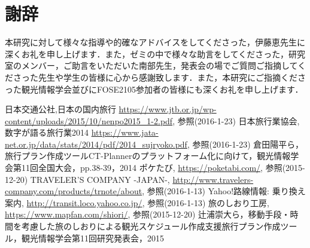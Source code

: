 \documentclass{funthesis}
\begin{document}
\chapter*{謝辞}
本研究に対して様々な指導や的確なアドバイスをしてくださった，伊藤恵先生に深くお礼を申し上げます．また，ゼミの中で様々な助言をしてくださった，研究室のメンバー，ご助言をいただいた南部先生，発表会の場でご質問ご指摘してくださった先生や学生の皆様に心から感謝致します．また，本研究にご指摘くださった観光情報学会並びにFOSE2105参加者の皆様にも深くお礼を申し上げます．



\begin{thebibliography}{9}
日本交通公社,日本の国内旅行  {\url{https://www.jtb.or.jp/wp-content/uploads/2015/10/nenpo2015_1-2.pdf}}, 参照(2016-1-23)
日本旅行業協会,数字が語る旅行業2014  {\url{https://www.jata-net.or.jp/data/stats/2014/pdf/2014_sujryoko.pdf}}, 参照(2016-1-23)
  倉田陽平ら，旅行プラン作成ツールCT-Plannerのプラットフォーム化に向けて，観光情報学会第11回全国大会，pp.38-39，2014
ポケたび,  {\url{https://poketabi.com/}}, 参照(2015-12-20)
TRAVELER'S COMPANY -JAPAN-,  {\url{http://www.travelers-company.com/products/trnote/about}}, 参照(2016-1-13)
Yahoo!路線情報: 乗り換え案内,  {\url{http://transit.loco.yahoo.co.jp/}}, 参照(2016-1-13)
旅のしおり工房,  {\url{https://www.mapfan.com/shiori/}}, 参照(2015-12-20)
 辻浦崇大ら，移動手段・時間を考慮した旅のしおりによる観光スケジュール作成支援旅行プラン作成ツール，観光情報学会第11回研究発表会，2015

\end{thebibliography}


\appendix



\end{document}
